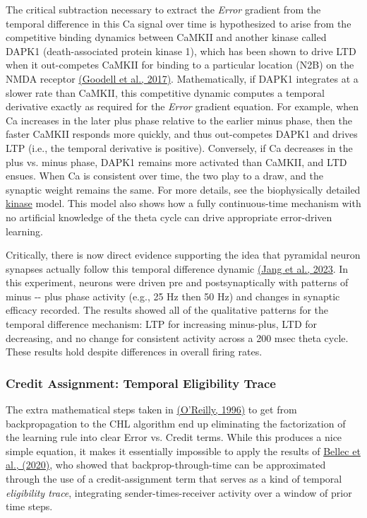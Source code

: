 \documentclass[11pt,twoside]{article}
\newif\myifpdf
\begin{document}
The critical subtraction necessary to extract the \emph{Error} gradient from the temporal difference in this Ca signal over time is hypothesized to arise from the competitive binding dynamics between CaMKII and another kinase called DAPK1 (death-associated protein kinase 1), which has been shown to drive LTD when it out-competes CaMKII for binding to a particular location (N2B) on the NMDA receptor \protect\hyperlink{references}{(Goodell et al., 2017)}. Mathematically, if DAPK1 integrates at a slower rate than CaMKII, this competitive dynamic computes a temporal derivative exactly as required for the \emph{Error} gradient equation. For example, when Ca increases in the later plus phase relative to the earlier minus phase, then the faster CaMKII responds more quickly, and thus out-competes DAPK1 and drives LTP (i.e., the temporal derivative is positive). Conversely, if Ca decreases in the plus vs. minus phase, DAPK1 remains more activated than CaMKII, and LTD ensues. When Ca is consistent over time, the two play to a draw, and the synaptic weight remains the same. For more details, see the biophysically detailed \href{https://github.com/ccnlab/kinase/tree/main/sims/kinase}{kinase} model. This model also shows how a fully continuous-time mechanism with no artificial knowledge of the theta cycle can drive appropriate error-driven learning.

Critically, there is now direct evidence supporting the idea that pyramidal neuron synapses actually follow this temporal difference dynamic \protect\hyperlink{references}{(Jang et al., 2023}. In this experiment, neurons were driven pre and postsynaptically with patterns of minus -\/- plus phase activity (e.g., 25 Hz then 50 Hz) and changes in synaptic efficacy recorded. The results showed all of the qualitative patterns for the temporal difference mechanism: LTP for increasing minus-plus, LTD for decreasing, and no change for consistent activity across a 200 msec theta cycle. These results hold despite differences in overall firing rates.


\subsubsection{Credit Assignment: Temporal Eligibility Trace}

The extra mathematical steps taken in \protect\hyperlink{references}{(O'Reilly, 1996)} to get from backpropagation to the CHL algorithm end up eliminating the factorization of the learning rule into clear Error vs. Credit terms. While this produces a nice simple equation, it makes it essentially impossible to apply the results of \protect\hyperlink{references}{Bellec et al., (2020)}, who showed that backprop-through-time can be approximated through the use of a credit-assignment term that serves as a kind of temporal \emph{eligibility trace}, integrating sender-times-receiver activity over a window of prior time steps.
\end{document}
